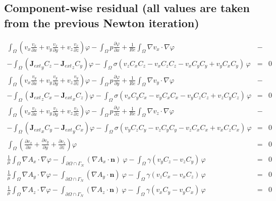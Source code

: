 \documentclass[smallextended]{svjour3}       %
\begin{document}
		\subsection{Component-wise residual (all values are taken from the previous Newton iteration)}
		\begin{eqnarray}
			\int_{\Omega} \left({v_x} \frac{v_x}{\partial x} + v_y \frac{v_x}{\partial y} + v_z \frac{v_x}{\partial z}\right) \varphi
			- \int_{\Omega} p \frac{\partial \varphi}{\partial x}
			+ \frac{1}{Re} \int_{\Omega} \nabla v_x \cdot \nabla \varphi
			\nonumber & -\\
			- \int_{\Omega} \left({\mathbf{J}_{ext}}_y C_z - {\mathbf{J}_{ext}}_z C_y\right) \varphi			
			- \int_{\Omega} \sigma \left(v_z C_x C_z - v_x C_z C_z - v_x C_y C_y + v_y C_x C_y\right)\, \varphi
			& = & 0\nonumber \\
			\int_{\Omega} \left(v_x \frac{v_y}{\partial x} + v_y \frac{v_y}{\partial y} + v_z \frac{v_y}{\partial z}\right) \varphi
			- \int_{\Omega} p \frac{\partial \varphi}{\partial y}
			+ \frac{1}{Re} \int_{\Omega} \nabla v_y \cdot \nabla \varphi
			\nonumber & -\\
			- \int_{\Omega} \left({\mathbf{J}_{ext}}_z C_x - {\mathbf{J}_{ext}}_x C_z\right) \varphi			
			- \int_{\Omega} \sigma \left(v_x C_y C_x - v_y C_x C_x - v_y C_z C_z + v_z C_y C_z\right)\, \varphi
			& = & 0\nonumber \\
			\int_{\Omega} \left(v_x \frac{v_z}{\partial x} + v_y \frac{v_z}{\partial y} + v_z \frac{v_z}{\partial z}\right) \varphi
			- \int_{\Omega} p \frac{\partial \varphi}{\partial z}
			+ \frac{1}{Re} \int_{\Omega} \nabla v_z \cdot \nabla \varphi
			\nonumber & -\\
			- \int_{\Omega} \left({\mathbf{J}_{ext}}_x C_y - {\mathbf{J}_{ext}}_y C_x\right) \varphi			
			- \int_{\Omega} \sigma \left(v_y C_z C_y - v_z C_y C_y - v_z C_x C_x + v_x C_z C_x\right)\, \varphi
			& = & 0\nonumber \\			
			\int_{\Omega} \left(\frac{\partial v_x}{\partial x} + \frac{\partial v_y}{\partial y} + \frac{\partial v_z}{\partial z}\right) \varphi & = & 0\nonumber \\
			\frac{1}{\mu}\int_{\Omega}\nabla A_x \cdot \nabla \varphi - \int_{\partial \Omega \cap \Gamma_{N}} \left(\nabla A_x\cdot \mathbf{n}\right)\ \varphi 
			 - \int_{\Omega} \gamma \left(v_y C_z - v_z C_y\right)\,\varphi & = & 0\nonumber \\
			\frac{1}{\mu}\int_{\Omega}\nabla A_y \cdot \nabla \varphi - \int_{\partial \Omega \cap \Gamma_{N}} \left(\nabla A_y\cdot \mathbf{n}\right)\ \varphi 
			 - \int_{\Omega} \gamma \left(v_z C_x - v_x C_z\right)\,\varphi & = & 0\nonumber \\
			\frac{1}{\mu}\int_{\Omega}\nabla A_z \cdot \nabla \varphi - \int_{\partial \Omega \cap \Gamma_{N}} \left(\nabla A_z\cdot \mathbf{n}\right)\ \varphi 
			 - \int_{\Omega} \gamma \left(v_x C_y - v_y C_x\right)\,\varphi & = & 0\nonumber \\
			 \nonumber 
		\end{eqnarray}
		
\end{document}
